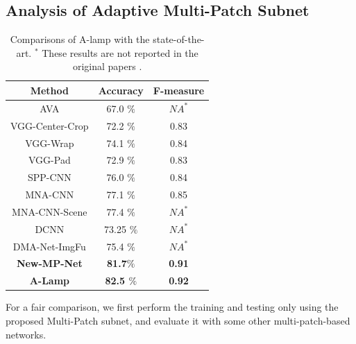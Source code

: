 \documentclass[10pt,twocolumn,letterpaper]{article}
\begin{document}
\subsection{Analysis of Adaptive Multi-Patch Subnet}
\begin{table}
	\begin{center}
		\begin{tabular}{||c|c|c||} 
			\hline
			Method & Accuracy & F-measure\\
			\hline\hline
			AVA & 67.0 $\%$ & $N{A^ * }$  \\
			VGG-Center-Crop & 72.2 $\%$ & 0.83 \\
			VGG-Wrap & 74.1 $\%$ & 0.84 \\
			VGG-Pad & 72.9 $\%$ & 0.83 \\
			\hline
			SPP-CNN & 76.0 $\%$ & 0.84 \\
			MNA-CNN & 77.1 $\%$ & 0.85 \\
			MNA-CNN-Scene & 77.4 $\%$ & $N{A^ * }$ \\
			DCNN & 73.25 $\%$ & $N{A^ * }$ \\
			DMA-Net-ImgFu & 75.4 $\%$ & $N{A^ * }$\\
			\hline\hline
			\textbf{New-MP-Net} & \textbf{81.7$\% $} & \textbf{0.91} \\
			\textbf{A-Lamp} & \textbf{82.5 $\%$} & \textbf{0.92} \\
			\hline
		\end{tabular} 
	\end{center}
	\caption{Comparisons of A-lamp with the state-of-the-art. $^*$ These results are not reported in the original papers \cite{Lu:2015:ICCV,Lu:2014:TMM:rating,Mai:2016:CVPR,Murray:MMP2012:AVA}.}
	\label{tabel2}
	\vspace{-3mm}
\end{table} 
For a fair comparison, we first perform the training and testing only using the proposed Multi-Patch subnet, and evaluate it with some other multi-patch-based networks. 
\end{document}
